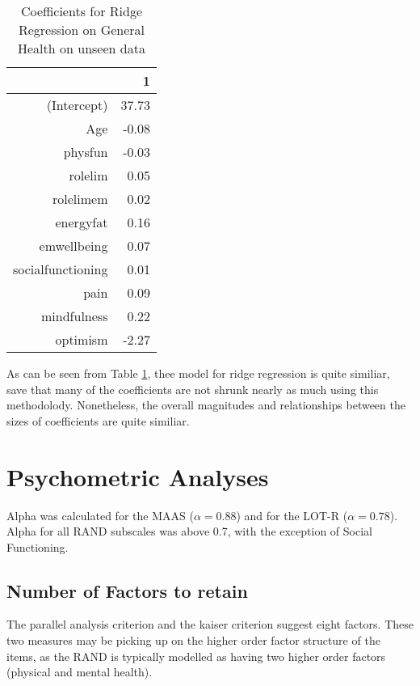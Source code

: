 \documentclass{article}
\begin{document}
\begin{table}[ht]
\centering
\begin{tabular}{rr}
  \hline
 & 1 \\ 
  \hline
(Intercept) & 37.73 \\ 
  Age & -0.08 \\ 
  physfun & -0.03 \\ 
  rolelim & 0.05 \\ 
  rolelimem & 0.02 \\ 
  energyfat & 0.16 \\ 
  emwellbeing & 0.07 \\ 
  socialfunctioning & 0.01 \\ 
  pain & 0.09 \\ 
  mindfulness & 0.22 \\ 
  optimism & -2.27 \\ 
   \hline
\end{tabular}
\caption{Coefficients for Ridge Regression on General Health on unseen data} 
\label{tab:hom1healthridge}
\end{table}
As can be seen from Table \ref{tab:hom1healthridge}, thee model for ridge regression is quite similiar, save that many of the coefficients are not shrunk nearly as much using this methodolody. Nonetheless, the overall magnitudes and relationships between the sizes of coefficients are quite similiar. 



\section{Psychometric Analyses}



Alpha was calculated for the MAAS ($\alpha=0.88$) and for the LOT-R ($\alpha=0.78$). Alpha for all RAND subscales was above 0.7, with the exception of Social Functioning. 

\subsection{Number of Factors to retain}




The parallel analysis criterion and the kaiser criterion suggest eight factors. These two measures may be picking up on the higher order factor structure of the items, as the RAND is typically modelled as having two higher order factors (physical and mental health).
\end{document}
